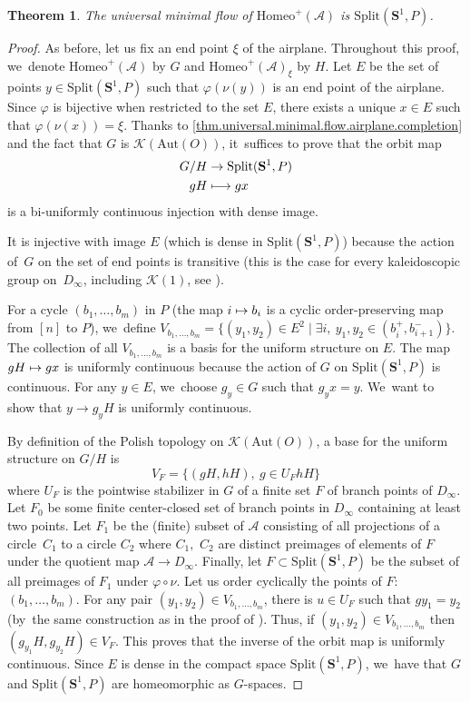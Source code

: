 \documentclass[JEP,XML,SOM,Unicode,NoFloatCountersInSection,published]{cedram}
\newcommand\mto{\mathchoice{\longmapsto}{\mapsto}{\mapsto}{\mapsto}}
\theoremstyle{plain}
\newtheorem{theorem}{Theorem}[section]
\theoremstyle{definition}
\theoremstyle{remark}
\newcommand{\Aut}{\mathrm{Aut}}
\newcommand{\Homeo}{\mathrm{Homeo}}
\newcommand{\Split}{\mathrm{Split}}
\newcommand{\A}{\mathcal{A}}
\newcommand{\K}{\mathcal{K}}
\begin{document}
\begin{theorem}
\label{thm.universal.minimal.flow.airplane}
The universal minimal flow of $\Homeo^+(\A)$ is $\Split(\mathbf{S}^1,P)$.
\end{theorem}

\begin{proof}
As before, let us fix an end point $\xi$ of the airplane.
Throughout this proof, we~denote $\Homeo^+(\A)$ by $G$ and $\Homeo^+(\A)_\xi$ by $H$.
Let $E$ be the set of points $y\in\Split(\mathbf{S}^1,P)$ such that $\varphi(\nu(y))$ is an end point of the airplane.
Since $\varphi$ is bijective when restricted to the set $E$, there exists a unique $x\in E$ such that $\varphi(\nu(x))=\xi$.
Thanks to \cref{thm.universal.minimal.flow.airplane.completion} and the fact that $G$ is $\K(\Aut(O))$, it~suffices to prove that the orbit map
\begin{align*}
G/H&\to\Split(\mathbf{S}^1,P)\\
gH&\mto gx
\end{align*}
is a bi-uniformly continuous injection with dense image.

It is injective with image $E$ (which is dense in $\Split(\mathbf{S}^1,P)$) because the action of~$G$ on the set of end points is transitive (this is the case for every kaleidoscopic group on~$D_\infty$, including $\K(1)$, see \cite[Prop.\,5.5]{Kaleidoscopic}).

For a cycle $(b_1,\dots,b_m)$ in $P$ (\ie the map $i\mto b_i$ is a cyclic order-preserving map from $[n]$ to $P$), we~define $V_{b_1,\dots,b_m}=\{(y_1,y_2)\in E^2 \mid \exists i,\ y_1,y_2\in(b_i^+,b_{i+1}^-)\}$.
The collection of all $V_{b_1,\dots,b_m}$ is a basis for the uniform structure on $E$.
The map $gH\mto gx$ is uniformly continuous because the action of $G$ on $\Split(\mathbf{S}^1,P)$ is continuous.
For any $y\in E$, we~choose $g_y\in G$ such that $g_yx=y$. We~want to show that $y\to g_y H$ is uniformly continuous.

By definition of the Polish topology on $\K(\Aut(O))$, a base for the uniform structure on $G/H$ is
\[
 V_F=\{(gH,hH),\ g\in U_FhH\} 
\]
where $U_F$ is the pointwise stabilizer in $G$ of a finite set $F$ of branch points of $D_\infty$.
Let $F_0$ be some finite center-closed set of branch points in $D_\infty$ containing at least two points.
Let $F_1$ be the (finite) subset of $\mathcal{A}$ consisting of all projections of a circle~$C_1$ to a circle $C_2$ where $C_1,$ $C_2$ are distinct preimages of elements of $F$ under the quotient map $\A\to D_\infty$.
Finally, let $F\subset \Split(\mathbf{S}^1,P)$ be the subset of all preimages of $F_1$ under $\varphi\circ\nu$.
Let us order cyclically the points of $F$: $(b_1,\dots,b_m)$.
For any pair $(y_1,y_2)\in V_{b_1,\dots,b_m}$, there is $u\in U_F$ such that $gy_1=y_2$ (by~the same construction as in the proof of \cite[Th.\,1.14]{Duchesne-2023}).
Thus, if $(y_1,y_2)\in V_{b_1,\dots,b_m}$ then $(g_{y_1}H,g_{y_2}H)\in V_F$.
This proves that the inverse of the orbit map is uniformly continuous.
Since $E$ is dense in the compact space $\Split(\mathbf{S}^1,P)$, we~have that $G$ and $\Split(\mathbf{S}^1,P)$ are homeomorphic as $G$-spaces.
\end{proof}
\end{document}

